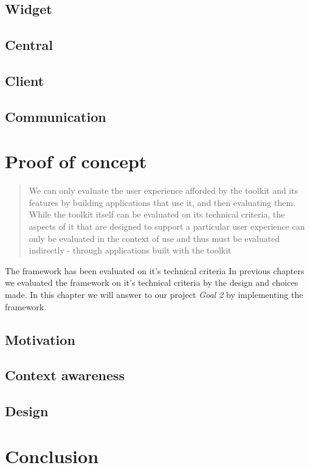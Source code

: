 \documentclass[]{report}
\begin{document}
\section{Widget}

\section{Central}

\section{Client}

\section{Communication}


\chapter{Proof of concept}

\blockquote{
We can only evaluate the user experience afforded by the toolkit and its features by building applications that use it, and then evaluating them. While the toolkit itself can be evaluated on its technical criteria, the aspects of it that are designed to support a particular user experience can only be evaluated in the context of use and thus must be evaluated indirectly - through applications built with the toolkit}\cite{Infrastructure (2003)}

The framework has been evaluated on it's technical criteria 
In previous chapters we evaluated the framework on it's technical criteria by the design and choices made. In this chapter we will answer to our project \textit{Goal 2} by implementing the framework.

\section{Motivation}

\section{Context awareness}

\section{Design}


\chapter{Conclusion}
\end{document}
